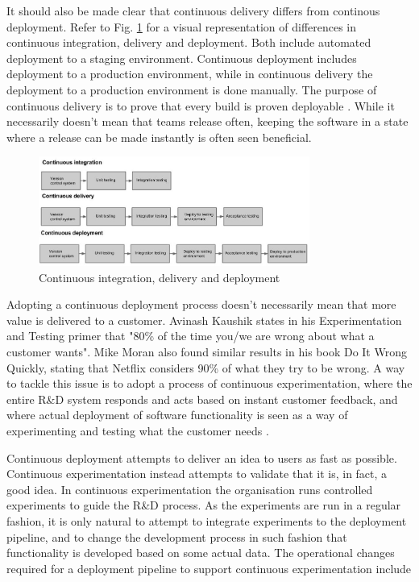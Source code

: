 \documentclass[conference]{IEEEtran}
\begin{document}
It should also be made clear that continuous delivery differs from continous deployment. Refer to Fig. \ref{fig1} for a visual representation of differences in continuous integration, delivery and deployment. Both include automated deployment to a staging environment. Continuous deployment includes deployment to a production environment, while in continuous delivery the deployment to a production environment is done manually. The purpose of continuous delivery is to prove that every build is proven deployable \cite{cdbook}. While it necessarily doesn't mean that teams release often, keeping the software in a state where a release can be made instantly is often seen beneficial.

\begin{figure}[!t]
	\centering
	\includegraphics[width=3.5in]{rtvd.jpg}
	\caption{Continuous integration, delivery and deployment}
	\label{fig1}
\end{figure}

Adopting a continuous deployment process doesn't necessarily mean that more value is delivered to a customer. Avinash Kaushik states in his Experimentation and Testing primer \cite{kaushik} that "80\% of the time you/we are wrong about what a customer wants". Mike Moran also found similar results in his book Do It Wrong Quickly, stating that Netflix considers 90\% of what they try to be wrong. A way to tackle this issue is to adopt a process of continuous experimentation, where the entire R\&D system responds and acts based on instant customer feedback, and where actual deployment of software functionality is seen as a way of experimenting and testing what the customer needs \cite{olsson2012climbing}.
 
Continuous deployment attempts to deliver an idea to users as fast as possible. Continuous experimentation instead attempts to validate that it is, in fact, a good idea. In continuous experimentation the organisation runs controlled experiments to guide the R\&D process. %
As the experiments are run in a regular fashion, it is only natural to attempt to integrate experiments to the deployment pipeline, and to change the development process in such fashion that functionality is developed based on some actual data. The operational changes required for a deployment pipeline to support continuous experimentation include %
\end{document}
